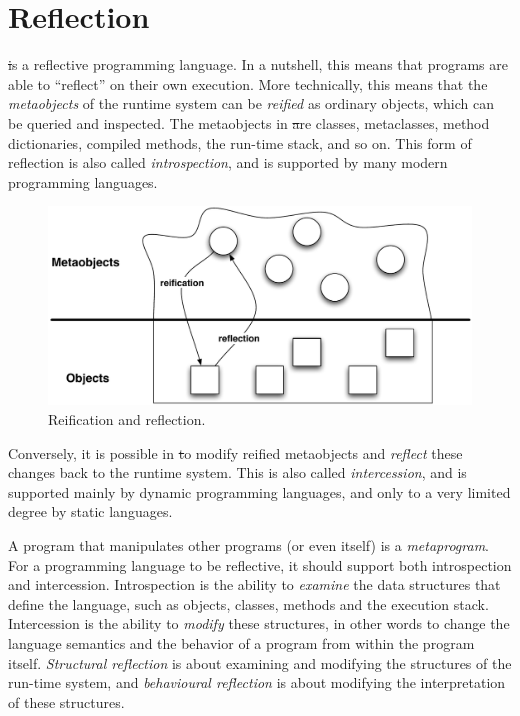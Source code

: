 \documentclass[a4paper,10pt,twoside]{book}
\begin{document}
	\sloppy
\fi
\chapter{Reflection}\label{cha:reflection}


\st is a reflective programming language.
In a nutshell, this means that programs are able to ``reflect'' on their own execution. 
More technically, this means that the \emph{metaobjects} of the runtime system can be \emph{reified} as ordinary objects, which can be queried and inspected.
The metaobjects in \st are classes, metaclasses, method dictionaries, compiled methods, the run-time stack, and so on.
This form of reflection is also called \emph{introspection}, and is supported by many modern programming languages.

\begin{figure}[ht]\centering
	\includegraphics[width=0.8\linewidth]{reflect}
	\caption{Reification and reflection.\label{fig:reflect}}
\end{figure}

Conversely, it is possible in \st to modify reified metaobjects and \emph{reflect} these changes back to the runtime system.
This is also called \emph{intercession}, and is supported mainly by dynamic programming languages, and only to a very limited degree by static languages.

A program that manipulates other programs (or even itself) is a \emph{metaprogram}.
For a programming language to be reflective, it should support both introspection and intercession.
Introspection is the ability to \emph{examine} the data structures that define the language, such as objects, classes, methods and the execution stack.
Intercession is the ability to \emph{modify} these structures, in other words to change the language semantics and the behavior of a program from within the program itself.
\emph{Structural reflection} is about examining and modifying the structures of the run-time system, and \emph{behavioural reflection} is about modifying the interpretation of these structures.
\end{document}
